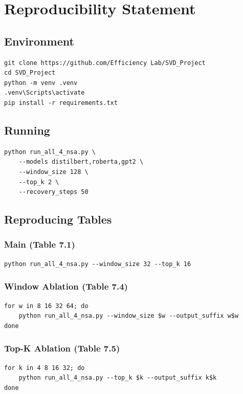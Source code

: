 
\section{Reproducibility Statement}

\subsection{Environment}

\begin{lstlisting}
git clone https://github.com/Efficiency Lab/SVD_Project
cd SVD_Project
python -m venv .venv
.venv\Scripts\activate
pip install -r requirements.txt
\end{lstlisting}

\subsection{Running}

\begin{lstlisting}
python run_all_4_nsa.py \
    --models distilbert,roberta,gpt2 \
    --window_size 128 \
    --top_k 2 \
    --recovery_steps 50
\end{lstlisting}

\subsection{Reproducing Tables}

\subsubsection{Main (Table 7.1)}
\begin{lstlisting}
python run_all_4_nsa.py --window_size 32 --top_k 16
\end{lstlisting}

\subsubsection{Window Ablation (Table 7.4)}
\begin{lstlisting}
for w in 8 16 32 64; do
    python run_all_4_nsa.py --window_size $w --output_suffix w$w
done
\end{lstlisting}

\subsubsection{Top-K Ablation (Table 7.5)}
\begin{lstlisting}
for k in 4 8 16 32; do
    python run_all_4_nsa.py --top_k $k --output_suffix k$k
done
\end{lstlisting}

